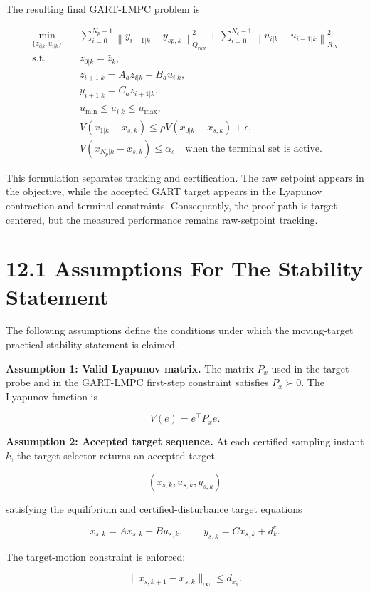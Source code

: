 \documentclass[11pt]{article}
\begin{document}
The resulting final GART-LMPC problem is


\[
\begin{aligned}
\min_{\{z_{i|k},u_{i|k}\}}
\quad
&
\sum_{i=0}^{N_p-1}
\left\|y_{i+1|k}-y_{sp,k}\right\|_{Q_{\mathrm{raw}}}^{2}
+
\sum_{i=0}^{N_c-1}
\left\|u_{i|k}-u_{i-1|k}\right\|_{R_{\Delta}}^{2}
\\
\text{s.t.}\quad
&
z_{0|k}=\hat z_k,
\\
&
z_{i+1|k}=A_a z_{i|k}+B_a u_{i|k},
\\
&
y_{i+1|k}=C_a z_{i+1|k},
\\
&
u_{\min}\le u_{i|k}\le u_{\max},
\\
&
V(x_{1|k}-x_{s,k})
\le
\rho V(x_{0|k}-x_{s,k})+\epsilon,
\\
&
V(x_{N_p|k}-x_{s,k})\le \alpha_s
\quad \text{when the terminal set is active.}
\end{aligned}
\]

This formulation separates tracking and certification. The raw setpoint appears in the objective, while the accepted GART target appears in the Lyapunov contraction and terminal constraints. Consequently, the proof path is target-centered, but the measured performance remains raw-setpoint tracking.

\section*{12.1 Assumptions For The Stability Statement}

The following assumptions define the conditions under which the moving-target practical-stability statement is claimed.

\textbf{Assumption 1: Valid Lyapunov matrix.}
The matrix $P_x$ used in the target probe and in the GART-LMPC first-step constraint satisfies $P_x\succ 0$. The Lyapunov function is

\[
V(e)=e^\top P_x e .
\]

\textbf{Assumption 2: Accepted target sequence.}
At each certified sampling instant $k$, the target selector returns an accepted target

\[
(x_{s,k},u_{s,k},y_{s,k})
\]

satisfying the equilibrium and certified-disturbance target equations

\[
x_{s,k}=Ax_{s,k}+Bu_{s,k},
\qquad
y_{s,k}=Cx_{s,k}+d^c_k .
\]

The target-motion constraint is enforced:

\[
\|x_{s,k+1}-x_{s,k}\|_\infty\le d_{x_s}.
\]
\end{document}
